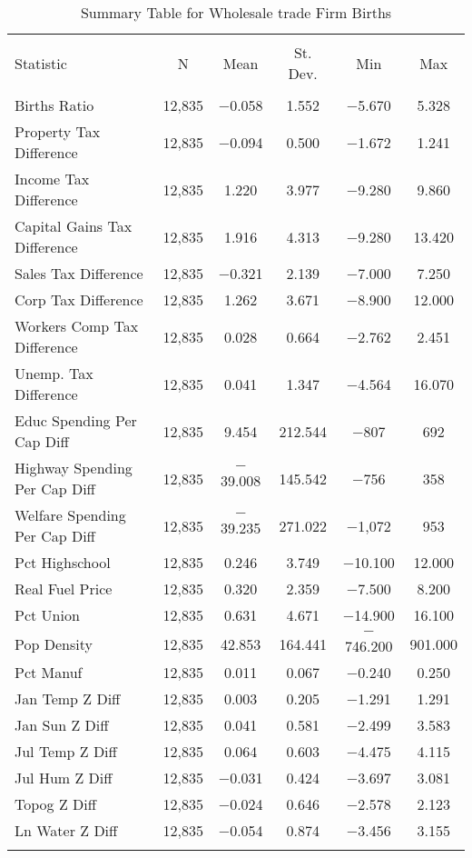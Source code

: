 
\begin{table}[!htbp] \centering 
  \caption{Summary Table for  Wholesale trade Firm Births} 
  \label{42summary} 
\begin{tabular}{@{\extracolsep{5pt}}lccccc} 
\\[-1.8ex]\hline 
\hline \\[-1.8ex] 
Statistic & \multicolumn{1}{c}{N} & \multicolumn{1}{c}{Mean} & \multicolumn{1}{c}{St. Dev.} & \multicolumn{1}{c}{Min} & \multicolumn{1}{c}{Max} \\ 
\hline \\[-1.8ex] 
Births Ratio & 12,835 & $-$0.058 & 1.552 & $-$5.670 & 5.328 \\ 
Property Tax Difference & 12,835 & $-$0.094 & 0.500 & $-$1.672 & 1.241 \\ 
Income Tax Difference & 12,835 & 1.220 & 3.977 & $-$9.280 & 9.860 \\ 
Capital Gains Tax Difference & 12,835 & 1.916 & 4.313 & $-$9.280 & 13.420 \\ 
Sales Tax Difference & 12,835 & $-$0.321 & 2.139 & $-$7.000 & 7.250 \\ 
Corp Tax Difference & 12,835 & 1.262 & 3.671 & $-$8.900 & 12.000 \\ 
Workers Comp Tax Difference & 12,835 & 0.028 & 0.664 & $-$2.762 & 2.451 \\ 
Unemp. Tax Difference & 12,835 & 0.041 & 1.347 & $-$4.564 & 16.070 \\ 
Educ Spending Per Cap Diff & 12,835 & 9.454 & 212.544 & $-$807 & 692 \\ 
Highway Spending Per Cap Diff & 12,835 & $-$39.008 & 145.542 & $-$756 & 358 \\ 
Welfare Spending Per Cap Diff & 12,835 & $-$39.235 & 271.022 & $-$1,072 & 953 \\ 
Pct Highschool & 12,835 & 0.246 & 3.749 & $-$10.100 & 12.000 \\ 
Real Fuel Price & 12,835 & 0.320 & 2.359 & $-$7.500 & 8.200 \\ 
Pct Union & 12,835 & 0.631 & 4.671 & $-$14.900 & 16.100 \\ 
Pop Density & 12,835 & 42.853 & 164.441 & $-$746.200 & 901.000 \\ 
Pct Manuf & 12,835 & 0.011 & 0.067 & $-$0.240 & 0.250 \\ 
Jan Temp Z Diff & 12,835 & 0.003 & 0.205 & $-$1.291 & 1.291 \\ 
Jan Sun Z Diff & 12,835 & 0.041 & 0.581 & $-$2.499 & 3.583 \\ 
Jul Temp Z Diff & 12,835 & 0.064 & 0.603 & $-$4.475 & 4.115 \\ 
Jul Hum Z Diff & 12,835 & $-$0.031 & 0.424 & $-$3.697 & 3.081 \\ 
Topog Z Diff & 12,835 & $-$0.024 & 0.646 & $-$2.578 & 2.123 \\ 
Ln Water Z Diff & 12,835 & $-$0.054 & 0.874 & $-$3.456 & 3.155 \\ 
\hline \\[-1.8ex] 
\end{tabular} 
\end{table} 
